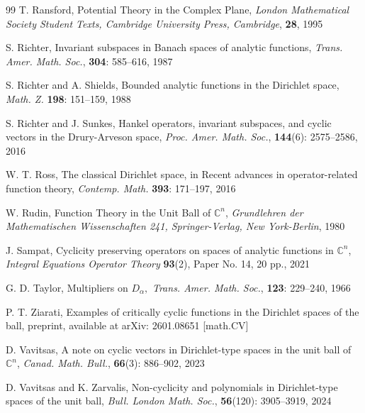 \documentclass[12pt]{amsart}
\theoremstyle{definition}\newtheorem{remark}[theorem]{Remark}
\theoremstyle{definition}\newtheorem{example}[theorem]{Example}
\theoremstyle{definition}\newtheorem{definition}{Definition}
\numberwithin{equation}{section}
\newcommand\CC{{\mathbb C}}
\begin{document}
\begin{thebibliography}{99}
T. Ransford, Potential Theory in the Complex Plane, \textit{London Mathematical Society Student Texts, Cambridge University Press, Cambridge}, \textbf{28}, 1995

S. Richter, Invariant subspaces in Banach spaces of analytic functions, \emph{Trans. Amer. Math. Soc.}, \textbf{304}: 585--616, 1987

S. Richter and A. Shields, Bounded analytic functions in the Dirichlet space, \emph{Math. Z.} \textbf{198}: 151--159, 1988

S. Richter and J. Sunkes, Hankel operators, invariant subspaces, and cyclic vectors in the Drury-Arveson space, \textit{Proc. Amer. Math. Soc.}, \textbf{144}(6): 2575--2586, 2016

W. T. Ross, The classical Dirichlet space, in Recent advances in operator-related function theory, \emph{Contemp. Math.}  \textbf{393}: 171--197, 2016

W. Rudin, Function Theory in the Unit Ball of $\CC^n$, \emph{Grundlehren  der Mathematischen Wissenschaften 241, Springer-Verlag, New York-Berlin}, 1980

J. Sampat, Cyclicity preserving operators on spaces of analytic functions in $\CC^n$, \emph{Integral Equations Operator Theory} \textbf{93}(2), Paper No. 14, 20 pp., 2021

G. D. Taylor, Multipliers on $D_\alpha,$ \emph{Trans. Amer. Math. Soc.}, \textbf{123}: 229--240, 1966

P. T. Ziarati, Examples of critically cyclic functions in the Dirichlet spaces of the ball, preprint, available at arXiv: 2601.08651 [math.CV]

D. Vavitsas, A note on cyclic vectors in Dirichlet-type spaces in the unit ball of ${\mathbb C}^n$, \textit{Canad. Math. Bull.},  \textbf{66}(3): 886--902, 2023 

D. Vavitsas and K. Zarvalis, Non-cyclicity and polynomials in Dirichlet-type spaces of the unit ball, \emph{Bull. London Math. Soc.}, \textbf{56}(120): 3905--3919, 2024

\end{thebibliography}
\end{document}

